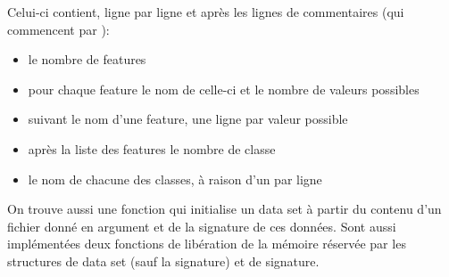 \documentclass[a4paper, 10pt]{article}
\begin{document}
Celui-ci contient, ligne par ligne et  après les lignes de commentaires (qui commencent par \mlc{//}):
\begin{itemize}
\item le nombre de features
\item pour chaque feature le nom de celle-ci et le nombre de valeurs possibles
\item suivant le nom d'une feature, une ligne par valeur possible
\item après la liste des features le nombre de classe
\item le nom de chacune des classes, à raison d'un par ligne
\end{itemize}
On trouve aussi une fonction  qui initialise un data set à partir du contenu d'un fichier  donné en argument et de la signature de ces données.
Sont aussi implémentées deux fonctions de libération de la mémoire réservée par les structures de data set (sauf la signature) et de signature.
\end{document}
